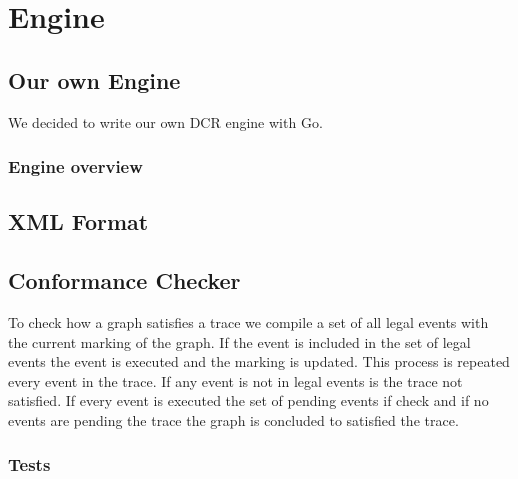 \section*{Engine}

\subsection*{Our own Engine}
We decided to write our own DCR engine with Go.

\subsubsection*{Engine overview}

\subsection*{XML Format}

\subsection*{Conformance Checker}
To check how a graph satisfies a trace we compile a set of all legal events
with the current marking of the graph. If the event is included in the set of legal
events the event is executed and the marking is updated. This process is repeated
every event in the trace. If any event is not in legal events is the trace not
satisfied. If every event is executed the set of pending events if check and if no
events are pending the trace the graph is concluded to satisfied the trace.

\subsubsection*{Tests}
